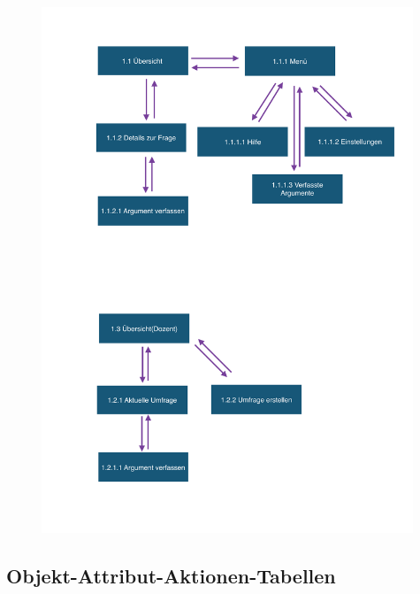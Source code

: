 \begin{figure}
  \vspace{-20pt}
  \begin{center}
    \includegraphics[page=1,width=0.99\textwidth]{./images/objekthierachie}
  \end{center}
  \vspace{-40pt}
\end{figure}

\clearpage
\subsection{Objekt-Attribut-Aktionen-Tabellen}
\label{sec:objektattribut}

